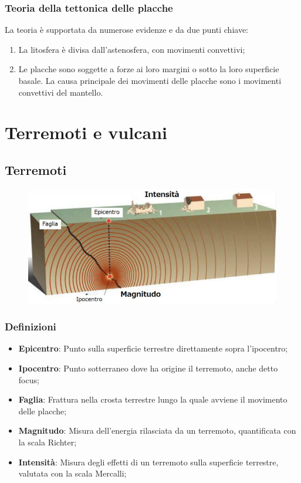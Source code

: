 \documentclass{article}
\begin{document}
\subsubsection{Teoria della tettonica delle placche}
La teoria è supportata da numerose evidenze e da due punti chiave:
\begin{enumerate}
    \item La litosfera è divisa dall'astenosfera, con movimenti convettivi;
    \item Le placche sono soggette a forze ai loro margini o sotto la loro superficie basale.
        La causa principale dei movimenti delle placche sono i movimenti convettivi del mantello.
\end{enumerate}

\section{Terremoti e vulcani}
\subsection{Terremoti}
\begin{figure}[ht!]
    \begin{center}
        \includegraphics[width=.6\textwidth]{media/geo_fisica/terremoti.png}
    \end{center}
\end{figure}

\subsubsection{Definizioni}
\begin{itemize}
    \item \textbf{Epicentro}: Punto sulla superficie terrestre direttamente sopra l'ipocentro;
    \item \textbf{Ipocentro}: Punto sotterraneo dove ha origine il terremoto, anche detto focus;
    \item \textbf{Faglia}: Frattura nella crosta terrestre lungo la quale avviene il movimento
        delle placche;
    \item \textbf{Magnitudo}: Misura dell'energia rilasciata da un terremoto, quantificata con
        la scala Richter;
    \item \textbf{Intensità}: Misura degli effetti di un terremoto sulla superficie terrestre,
        valutata con la scala Mercalli;
\end{itemize}
\end{document}
